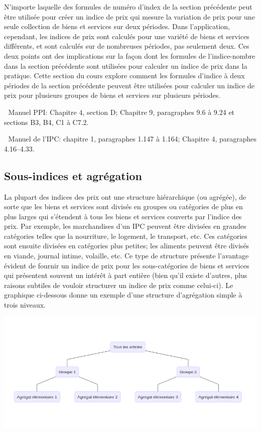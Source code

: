 \documentclass[
]{article}
\begin{document}
N'importe laquelle des formules de numéro d'index de la section précédente peut être utilisée pour créer un indice de prix qui mesure la variation de prix pour une seule collection de biens et services sur deux périodes. Dans l'application, cependant, les indices de prix sont calculés pour une variété de biens et services différents, et sont calculés sur de nombreuses périodes, pas seulement deux. Ces deux points ont des implications sur la façon dont les formules de l'indice-nombre dans la section précédente sont utilisées pour calculer un indice de prix dans la pratique. Cette section du cours explore comment les formules d'indice à deux périodes de la section précédente peuvent être utilisées pour calculer un indice de prix pour plusieurs groupes de biens et services sur plusieurs périodes.

📖 Manuel PPI: Chapitre 4, section D; Chapitre 9, paragraphes 9.6 à 9.24 et sections B3, B4, C1 à C7.2.

📖 Manuel de l'IPC: chapitre 1, paragraphes 1.147 à 1.164; Chapitre 4, paragraphes 4.16--4.33.

\hypertarget{sous-indices-et-agruxe9gation}{%
\subsection{Sous-indices et agrégation}\label{sous-indices-et-agruxe9gation}}

La plupart des indices des prix ont une structure hiérarchique (ou agrégée), de sorte que les biens et services sont divisés en groupes ou catégories de plus en plus larges qui s'étendent à tous les biens et services couverts par l'indice des prix. Par exemple, les marchandises d'un IPC peuvent être divisées en grandes catégories telles que la nourriture, le logement, le transport, etc. Ces catégories sont ensuite divisées en catégories plus petites; les aliments peuvent être divisés en viande, journal intime, volaille, etc. Ce type de structure présente l'avantage évident de fournir un indice de prix pour les sous-catégories de biens et services qui présentent souvent un intérêt à part entière (bien qu'il existe d'autres, plus raisons subtiles de vouloir structurer un indice de prix comme celui-ci). Le graphique ci-dessous donne un exemple d'une structure d'agrégation simple à trois niveaux.

\includegraphics{img/plot1.png}
\end{document}

